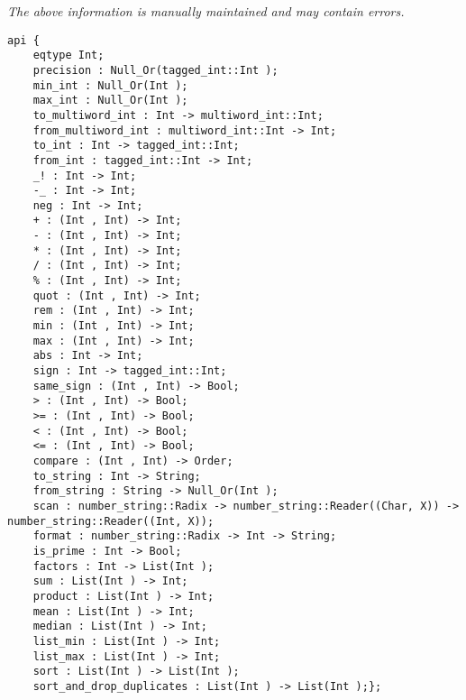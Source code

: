\label{api:Int}

{\tiny \it The above information is manually maintained and may contain errors.}
\begin{verbatim}
api {
    eqtype Int;
    precision : Null_Or(tagged_int::Int );
    min_int : Null_Or(Int );
    max_int : Null_Or(Int );
    to_multiword_int : Int -> multiword_int::Int;
    from_multiword_int : multiword_int::Int -> Int;
    to_int : Int -> tagged_int::Int;
    from_int : tagged_int::Int -> Int;
    _! : Int -> Int;
    -_ : Int -> Int;
    neg : Int -> Int;
    + : (Int , Int) -> Int;
    - : (Int , Int) -> Int;
    * : (Int , Int) -> Int;
    / : (Int , Int) -> Int;
    % : (Int , Int) -> Int;
    quot : (Int , Int) -> Int;
    rem : (Int , Int) -> Int;
    min : (Int , Int) -> Int;
    max : (Int , Int) -> Int;
    abs : Int -> Int;
    sign : Int -> tagged_int::Int;
    same_sign : (Int , Int) -> Bool;
    > : (Int , Int) -> Bool;
    >= : (Int , Int) -> Bool;
    < : (Int , Int) -> Bool;
    <= : (Int , Int) -> Bool;
    compare : (Int , Int) -> Order;
    to_string : Int -> String;
    from_string : String -> Null_Or(Int );
    scan : number_string::Radix -> number_string::Reader((Char, X)) -> number_string::Reader((Int, X));
    format : number_string::Radix -> Int -> String;
    is_prime : Int -> Bool;
    factors : Int -> List(Int );
    sum : List(Int ) -> Int;
    product : List(Int ) -> Int;
    mean : List(Int ) -> Int;
    median : List(Int ) -> Int;
    list_min : List(Int ) -> Int;
    list_max : List(Int ) -> Int;
    sort : List(Int ) -> List(Int );
    sort_and_drop_duplicates : List(Int ) -> List(Int );};
\end{verbatim}
\index[fun]{<=}
\index[fun]{<}
\index[fun]{>=}
\index[fun]{>}
\index[fun]{\%}
\index[fun]{/}
\index[fun]{*}
\index[fun]{-}
\index[fun]{+}
\index[fun]{-\_}
